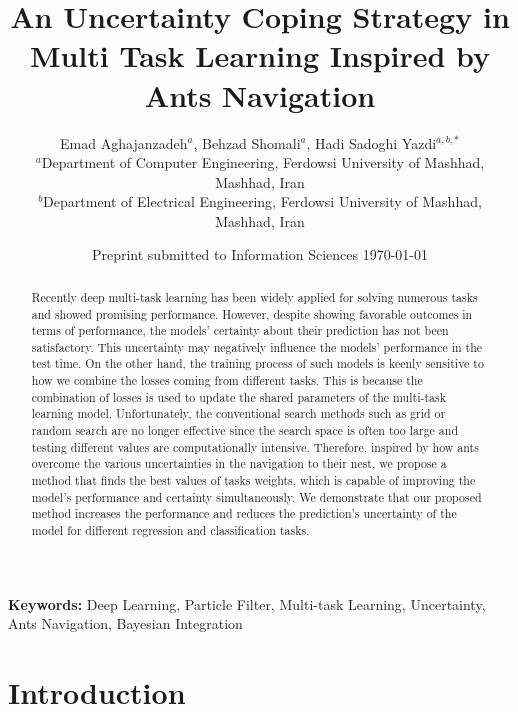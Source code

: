 \documentclass[12pt,a4paper]{article}
\begin{document}
	
	\title{An Uncertainty Coping Strategy in Multi Task Learning Inspired by Ants Navigation}
	\author{
		Emad Aghajanzadeh$^a$, Behzad Shomali$^a$, Hadi Sadoghi Yazdi$^{a,b,*}$ \\
		$^a$Department of Computer Engineering, Ferdowsi University of Mashhad, Mashhad, Iran \\
		$^b$Department of Electrical Engineering, Ferdowsi University of Mashhad, Mashhad, Iran
	}
	\date{Preprint submitted to Information Sciences \today}
	
	\maketitle
	
	\begin{abstract}
		Recently deep multi-task learning has been widely applied for solving numerous tasks and showed promising performance. However, despite showing favorable outcomes in terms of performance, the models' certainty about their prediction has not been satisfactory. This uncertainty may negatively influence the models' performance in the test time. On the other hand, the training process of such models is keenly sensitive to how we combine the losses coming from different tasks. This is because the combination of losses is used to update the shared parameters of the multi-task learning model. Unfortunately, the conventional search methods such as grid or random search are no longer effective since the search space is often too large and testing different values are computationally intensive. Therefore, inspired by how ants overcome the various uncertainties in the navigation to their nest, we propose a method that finds the best values of tasks weights, which is capable of improving the model's performance and certainty simultaneously. We demonstrate that our proposed method increases the performance and reduces the prediction's uncertainty of the model for different regression and classification tasks.
	\end{abstract}
	
\textbf{Keywords:} Deep Learning, Particle Filter, Multi-task Learning, Uncertainty, Ants Navigation, Bayesian Integration

	
	\section{Introduction}
	
\end{document}
